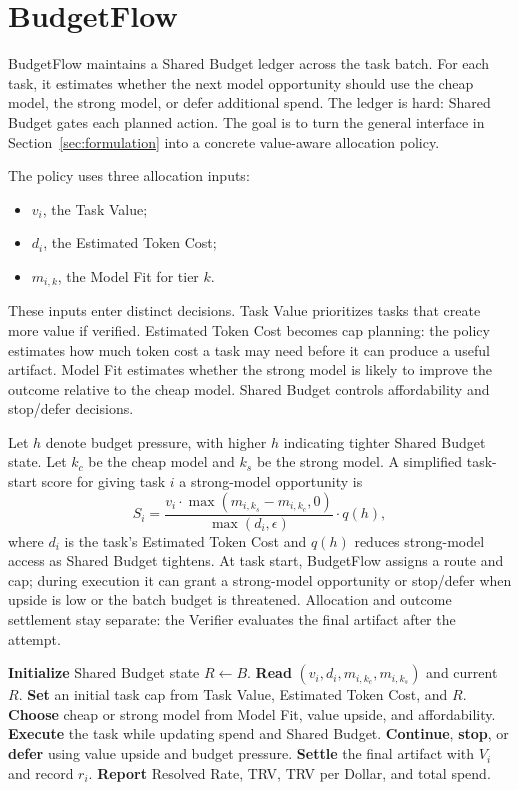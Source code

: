 \documentclass[letterpaper]{article}
\newcommand{\method}{BudgetFlow\xspace}
\newcommand{\trv}{TRV\xspace}
\newcommand{\taskvalue}{Task Value\xspace}
\newcommand{\tokencost}{Estimated Token Cost\xspace}
\newcommand{\modelfit}{Model Fit\xspace}
\newcommand{\sharedbudget}{Shared Budget\xspace}
\newcommand{\verifier}{Verifier\xspace}
\begin{document}
\section{BudgetFlow}
\label{sec:method}
\method maintains a \sharedbudget ledger across the task batch. For each task, it estimates whether the next model opportunity should use the cheap model, the strong model, or defer additional spend. The ledger is hard: \sharedbudget gates each planned action. The goal is to turn the general interface in Section~\ref{sec:formulation} into a concrete value-aware allocation policy.

The policy uses three allocation inputs:

\begin{itemize}
    \item $v_i$, the \taskvalue;
    \item $d_i$, the \tokencost;
    \item $m_{i,k}$, the \modelfit for tier $k$.
\end{itemize}

These inputs enter distinct decisions. \taskvalue prioritizes tasks that create more value if verified. \tokencost becomes cap planning: the policy estimates how much token cost a task may need before it can produce a useful artifact. \modelfit estimates whether the strong model is likely to improve the outcome relative to the cheap model. \sharedbudget controls affordability and stop/defer decisions.

Let $h$ denote budget pressure, with higher $h$ indicating tighter \sharedbudget state. Let $k_c$ be the cheap model and $k_s$ be the strong model. A simplified task-start score for giving task $i$ a strong-model opportunity is
\[
    S_i =
    \frac{v_i \cdot \max(m_{i,k_s}-m_{i,k_c},0)}
    {\max(d_i,\epsilon)}
    \cdot q(h),
\]
where $d_i$ is the task's \tokencost and $q(h)$ reduces strong-model access as \sharedbudget tightens. At task start, \method assigns a route and cap; during execution it can grant a strong-model opportunity or stop/defer when upside is low or the batch budget is threatened. Allocation and outcome settlement stay separate: the \verifier evaluates the final artifact after the attempt.

\begin{algorithm}[t]
\caption{BudgetFlow batch policy sketch}
\label{alg:budgetflow}
\begin{algorithmic}[1]
\STATE \textbf{Initialize} \sharedbudget state $R \leftarrow B$.
    \STATE \textbf{Read} $(v_i,d_i,m_{i,k_c},m_{i,k_s})$ and current $R$.
    \STATE \textbf{Set} an initial task cap from \taskvalue, \tokencost, and $R$.
    \STATE \textbf{Choose} cheap or strong model from \modelfit, value upside, and affordability.
    \STATE \textbf{Execute} the task while updating spend and \sharedbudget.
    \STATE \textbf{Continue}, \textbf{stop}, or \textbf{defer} using value upside and budget pressure.
    \STATE \textbf{Settle} the final artifact with $V_i$ and record $r_i$.
\ENDFOR
\STATE \textbf{Report} Resolved Rate, \trv, \trv per Dollar, and total spend.
\end{algorithmic}
\end{algorithm}
\end{document}
